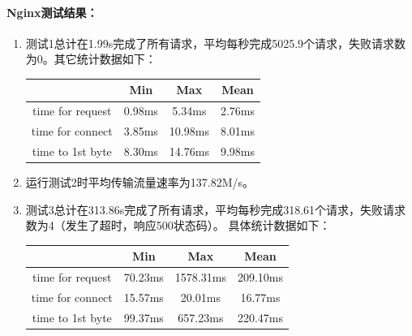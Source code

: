 \documentclass[twoside]{CUGThesis}
\begin{document}
	\paragraph{Nginx测试结果：}
	\begin{enumerate}
	\item 测试1总计在1.99s完成了所有请求，平均每秒完成5025.9个请求，失败请求数为0。其它统计数据如下：
	\begin{center}
	\begin{tabular}{|c|c|c|c|} 
		\hline
		 \ & Min & Max & Mean  \\ \hline
		time for request & 0.98ms  & 5.34ms & 2.76ms \\ \hline
		time for connect & 3.85ms & 10.98ms & 8.01ms \\ \hline
		time to 1st byte & 8.30ms  & 14.76ms & 9.98ms \\
		\hline
	\end{tabular}
	\end{center}
	\item 运行测试2时平均传输流量速率为137.82M/s。
	\item 测试3总计在313.86s完成了所有请求，平均每秒完成318.61个请求，失败请求数为4（发生了超时，响应500状态码）。
	具体统计数据如下：
	\begin{center}
		\begin{tabular}{|c|c|c|c|} 
			\hline
			 \ & Min & Max & Mean  \\ \hline
			time for request & 70.23ms  & 1578.31ms & 209.10ms \\ \hline
			time for connect & 15.57ms & 20.01ms & 16.77ms \\ \hline
			time to 1st byte & 99.37ms  & 657.23ms & 220.47ms \\
			\hline
		\end{tabular}
		\end{center}
	\end{enumerate}
\end{document}
